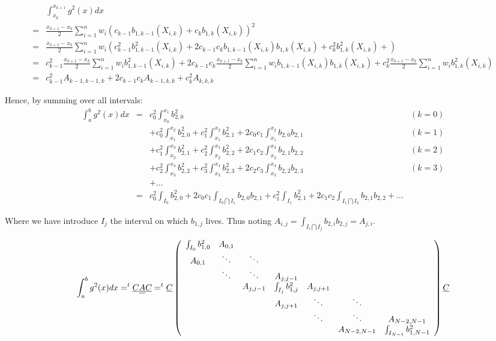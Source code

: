 \documentclass[paper=a4, fontsize=11pt]{scrartcl}
\numberwithin{equation}{section}		%
\numberwithin{figure}{section}			%
\numberwithin{table}{section}				%
\begin{document}
\begin{landscape}
$$
\begin{array}{lll}
& \int_{x_k}^{x_{k+1}} g^2(x)dx\\
= & \frac{x_{k+1}-x_k}{2}\sum_{i=1}^n w_i \left(c_{k-1}b_{1,k-1}\left(X_{i,k}\right) + c_{k}b_{1,k}\left(X_{i,k}\right)\right)^2\\
= & \frac{x_{k+1}-x_k}{2}\sum_{i=1}^n w_i \left(c_{k-1}^2b_{1,k-1}^2\left(X_{i,k}\right) + 2c_{k-1}c_{k}b_{1,k-1}\left(X_{i,k}\right)b_{1,k}\left(X_{i,k}\right) + c_{k}^2b_{1,k}^2\left(X_{i,k}\right) + \right)\\
= & c_{k-1}^2\frac{x_{k+1}-x_k}{2}\sum_{i=1}^n w_ib_{1,k-1}^2\left(X_{i,k}\right) + 2c_{k-1}c_{k}\frac{x_{k+1}-x_k}{2}\sum_{i=1}^n w_ib_{1,k-1}\left(X_{i,k}\right)b_{1,k}\left(X_{i,k}\right) + c_{k}^2\frac{x_{k+1}-x_k}{2}\sum_{i=1}^n w_ib_{1,k}^2\left(X_{i,k}\right)\\
= & c_{k-1}^2A_{k-1,k-1,k} + 2c_{k-1}c_{k}A_{k-1,k,k} + c_{k}^2A_{k,k,k}
\end{array}
$$

Hence, by summing over all intervals:
$$
\begin{array}{llll}
\int_{a}^{b} g^2(x)dx & = & c_{0}^2\int_{x_0}^{x_{1}}b_{2,0}^2 & (k=0)\\
&& + c_{0}^2\int_{x_1}^{x_{2}}b_{2,0}^2 + c_{1}^2\int_{x_1}^{x_{2}}b_{2,1}^2 + 2c_{0}c_{1}\int_{x_1}^{x_{2}}b_{2,0}b_{2,1} & (k=1)\\
&& + c_{1}^2\int_{x_2}^{x_{3}}b_{2,1}^2 + c_{2}^2\int_{x_2}^{x_{3}}b_{2,2}^2 + 2c_{1}c_{2}\int_{x_2}^{x_{3}}b_{2,1}b_{2,2} & (k=2)\\
&& + c_{2}^2\int_{x_3}^{x_{4}}b_{2,2}^2 + c_{3}^2\int_{x_3}^{x_{4}}b_{2,3}^2 + 2c_{2}c_{3}\int_{x_3}^{x_{4}}b_{2,2}b_{2,3} & (k=3)\\
&& + \hdots &\\
& = & c_{0}^2\int_{I_0}b_{2,0}^2 + 2c_{0}c_{1}\int_{I_0\bigcap I_1}b_{2,0}b_{2,1} + c_{1}^2\int_{I_1}b_{2,1}^2 + 2c_{1}c_{2}\int_{I_1\bigcap I_2}b_{2,1}b_{2,2} + \hdots&
\end{array}
$$

Where we have introduce $I_j$ the interval on which $b_{1,j}$ lives. Thus noting $A_{i,j} = \int_{I_i\bigcap I_j}b_{2,i}b_{2,j} = A_{j,i}$.

$$
\int_{a}^{b} g^2(x)dx = ^t\underline{C}\underline{\underline{A}}\underline{C} = ^t\underline{C} \left(\begin{array}{ccccccc} \int_{I_0}b_{1,0}^2&A_{0,1}&&&&&\\ A_{0,1}&\ddots&\ddots&&&&\\ &\ddots&\ddots&A_{j,j-1}&&&\\ &&A_{j,j-1}&\int_{I_j}b_{1,j}^2&A_{j,j+1}&&\\ &&&A_{j,j+1}&\ddots&\ddots&\\ &&&&\ddots&\ddots&A_{N-2,N-1}\\ &&&&&A_{N-2,N-1}&\int_{I_{N-1}}b_{1,N-1}^2 \end{array}\right) \underline{C}\\
$$



\end{landscape}
\end{document}
